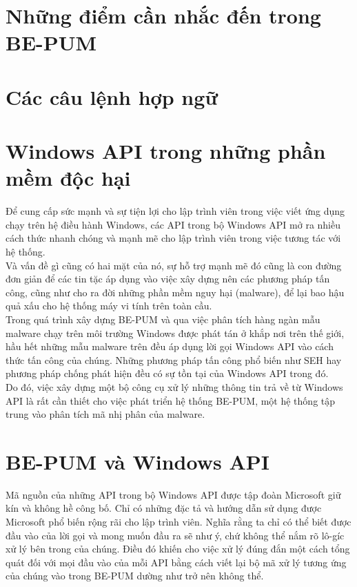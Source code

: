 \documentclass[14pt]{hcmutarticle}
\begin{document}
\section{Những điểm cần nhắc đến trong BE-PUM}



\section{Các câu lệnh hợp ngữ}



\section{Windows API trong những phần mềm độc hại}

Để cung cấp sức mạnh và sự tiện lợi cho lập trình viên trong việc viết ứng dụng chạy trên hệ điều hành Windows, các API trong bộ Windows API mở ra nhiều cách thức nhanh chóng và mạnh mẽ cho lập trình viên trong việc tương tác với hệ thống.\\

Và vấn đề gì cũng có hai mặt của nó, sự hỗ trợ mạnh mẽ đó cũng là con đường đơn giản để các tin tặc áp dụng vào việc xây dựng nên các phương pháp tấn công, cũng như cho ra đời những phần mềm nguy hại (malware), để lại bao hậu quả xấu cho hệ thống máy vi tính trên toàn cầu.\\

Trong quá trình xây dựng BE-PUM và qua việc phân tích hàng ngàn mẫu malware chạy trên môi trường Windows được phát tán ở khắp nơi trên thế giới, hầu hết những mẫu malware trên đều áp dụng lời gọi Windows API vào cách thức tấn công của chúng. Những phương pháp tấn công phổ biến như SEH hay phương pháp chống phát hiện đều có sự tồn tại của Windows API trong đó.\\

Do đó, việc xây dựng một bộ công cụ xử lý những thông tin trả về từ Windows API là rất cần thiết cho việc phát triển hệ thống BE-PUM, một hệ thống tập trung vào phân tích mã nhị phân của malware.\\




\section{BE-PUM và Windows API}

Mã nguồn của những API trong bộ Windows API được tập đoàn Microsoft giữ kín và không hề công bố. Chỉ có những đặc tả và hướng dẫn sử dụng được Microsoft phổ biến rộng rãi cho lập trình viên. Nghĩa rằng ta chỉ có thể biết được đầu vào của lời gọi và mong muốn đầu ra sẽ như ý, chứ không thể nắm rõ lô-gíc xử lý bên trong của chúng. Điều đó khiến cho việc xử lý đúng đắn một cách tổng quát đối với mọi đầu vào của mỗi API bằng cách viết lại bộ mã xử lý tương ứng của chúng vào trong BE-PUM dường như trở nên không thể.\\
\end{document}
